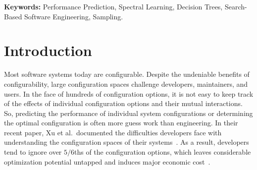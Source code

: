 \documentclass{sig-alternative}
\begin{document}
 
\noindent
{\bf Keywords:} Performance Prediction, 
Spectral Learning, 
Decision Trees,
Search-Based Software Engineering, 
Sampling.
 

 
\section{Introduction}
 

Most software systems today are configurable. Despite the undeniable benefits
of configurability, large configuration spaces challenge developers, maintainers, and users. In the face of hundreds of configuration options, it is not easy to keep track of the effects of individual configuration options and their mutual interactions. So, predicting the performance of individual system configurations or determining the optimal configuration is often more guess work than engineering. In their recent paper, Xu et al.\ documented the  difficulties developers face
with understanding  the configuration spaces of their systems~\cite{xu2015hey}. As a result, developers tend to ignore over $5/6$ths of the configuration options, which leaves considerable optimization potential untapped and induces major economic cost~\cite{xu2015hey}.
\end{document}
